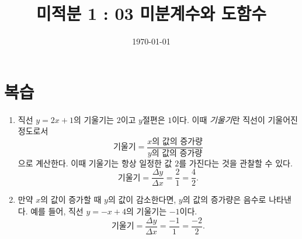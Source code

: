 \documentclass{oblivoir}
\title{미적분 1 : 03 미분계수와 도함수}
\date{\today}
\author{}
\begin{document}
\maketitle

\tableofcontents
\clearpage

\section{복습}
%
\begin{enumerate}
\item
직선 \(y=2x+1\)의 기울기는 \(2\)이고 \(y\)절편은 \(1\)이다.
이때 \emph{기울기}란 직선이 기울어진 정도로서
\[\text{기울기}=\frac{x\text{의 값의 증가량}}{y\text{의 값의 증가량}}\]
으로 계산한다.
이때 기울기는 항상 일정한 값 \(2\)를 가진다는 것을 관찰할 수 있다.
\[\text{기울기}=\frac{\Delta y}{\Delta x}=\frac21=\frac42.\]
\item
만약 \(x\)의 값이 증가할 때 \(y\)의 값이 감소한다면, \(y\)의 값의 증가량은 음수로 나타낸다.
예를 들어, 직선 \(y=-x+4\)의 기울기는 \(-1\)이다.
\[\text{기울기}=\frac{\Delta y}{\Delta x}=\frac{-1}1=\frac{-2}2.\]
\end{enumerate}
\end{document}
